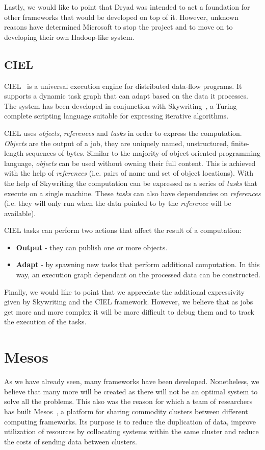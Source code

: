 \documentclass[11pt,a4paper,twoside]{report}
\begin{document}
Lastly, we would like to point that Dryad was intended to act a foundation for other frameworks that would be developed on top of it. However, unknown reasons have determined Microsoft to stop the project and to move on to developing their own Hadoop-like system.

\subsection{CIEL}
CIEL~\cite{Ciel} is a universal execution engine for distributed data-flow programs. It supports a dynamic task graph that can adapt based on the data it processes. The system has been developed in conjunction with Skywriting~\cite{Skywriting}, a Turing complete scripting language suitable for expressing iterative algorithms.


CIEL uses \textit{objects}, \textit{references} and \textit{tasks} in order to express the computation. \textit{Objects} are the output of a job, they are uniquely named, unstructured, finite-length sequences of bytes. Similar to the majority of object oriented programming language, \textit{objects} can be used without owning their full content. This is achieved with the help of \textit{references} (i.e. pairs of name and set of object locations). With the help of Skywriting the computation can be expressed as a series of \textit{tasks} that execute on a single machine. These \textit{tasks} can also have dependencies on \textit{references} (i.e. they will only run when the data pointed to by the \textit{reference} will be available).


CIEL tasks can perform two actions that affect the result of a computation:
\begin{itemize}
\item{}
\textbf{Output} - they can publish one or more objects.
\item{}
\textbf{Adapt} - by spawning new tasks that perform additional computation. In this way, an execution graph dependant on the processed data can be constructed.
\end{itemize}


Finally, we would like to point that we appreciate the additional expressivity given by Skywriting and the CIEL framework. However, we believe that as jobs get more and more complex it will be more difficult to debug them and to track the execution of the tasks.

\section{Mesos}
As we have already seen, many frameworks have been developed. Nonetheless, we believe that many more will be created as there will not be an optimal system to solve all the problems. This also was the reason for which a team of researchers  has built Mesos~\cite{Mesos, Mesos2}, a platform for sharing commodity clusters between different computing frameworks. Its purpose is to reduce the duplication of data, improve utilization of resources by collocating systems within the same cluster and reduce the costs of sending data between clusters. 
\end{document}
